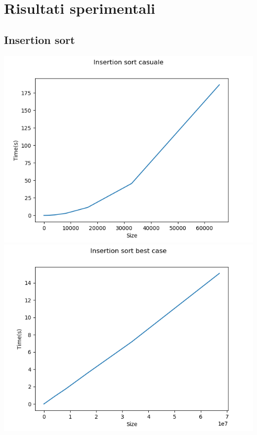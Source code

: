 \documentclass[]{article}
\begin{document}
\section{Risultati sperimentali}
\subsection{Insertion sort}
\begin{center}
\includegraphics[scale=0.5]{InsertionSortCasuale}\\
\includegraphics[scale=0.5]{InsertionSortBestCase}\\

\end{center}
\end{document}
